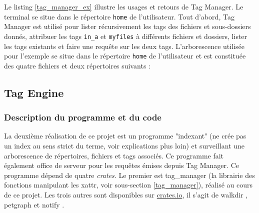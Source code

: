 Le listing \ref{tag_manager_ex} illustre les usages et retours de Tag Manager. Le terminal se situe 
dans le répertoire \texttt{home} de l'utilisateur. Tout d'abord, Tag Manager est utilisé pour 
lister récursivement les tags des fichiers et sous-dossiers donnés, attribuer les tags \texttt{in_a} 
et \texttt{myfiles} à différents fichiers et dossiers, lister les tags existants et faire 
une requête sur les deux tags. L'arborescence utilisée pour l'exemple se situe dans le répertoire 
\texttt{home} de l'utilisateur et est constituée des quatre fichiers et deux répertoires suivants :
\bigbreak
{}
\bigbreak


\subsection{Tag Engine}\label{tag_engine_realisation}
\subsubsection{Description du programme et du code}
La deuxième réalisation de ce projet est un programme "indexant" (ne crée pas un index au sens 
strict du terme, voir explications plus loin) et surveillant une arborescence de 
répertoires, fichiers et tags associés. Ce programme fait également office de serveur pour les 
requêtes émises depuis Tag Manager. Ce programme dépend de quatre \textit{crates}. Le premier est 
tag\_manager (la librairie des fonctions manipulant les \acrshort{xattr}, voir sous-section \ref{tag_manager}), 
réalisé au cours de ce projet. Les trois autres sont disponibles sur \href{https://crates.io}{crates.io}, 
il s'agit de walkdir \cite{ref43}, petgraph \cite{ref44} et notify \cite{ref45}.

